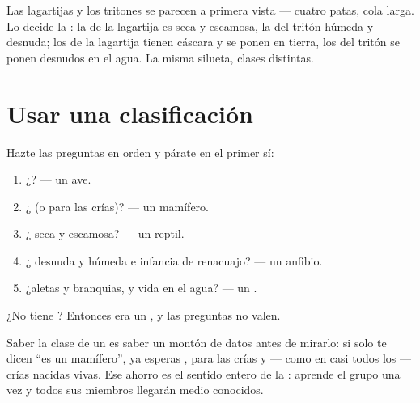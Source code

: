 \begin{remark}\label{rem:g4:classifying-animals:confusion}
Las lagartijas y los tritones se parecen a primera vista --- cuatro
patas, cola larga. Lo decide la : la de la lagartija es seca y
escamosa, la del tritón húmeda y desnuda; los  de la lagartija
tienen cáscara y se ponen en tierra, los del tritón se ponen desnudos
en el agua. La misma silueta, clases distintas.
\end{remark}

\section{Usar una clasificación}

\begin{method}\label{met:g4:classifying-animals:place}
Hazte las preguntas en orden y párate en el primer sí:
\begin{enumerate}
  \item ¿? --- un ave.
  \item ¿ (o  para las crías)? --- un mamífero.
  \item ¿ seca y escamosa? --- un reptil.
  \item ¿ desnuda y húmeda e infancia de renacuajo? --- un
        anfibio.
  \item ¿aletas y branquias, y vida en el agua? --- un .
\end{enumerate}
¿No tiene ? Entonces era un , y las
preguntas no valen.
\end{method}

\begin{proposition}\label{prop:g4:classifying-animals:free}
Saber la clase de un  es saber un montón de datos antes de
mirarlo: si solo te dicen ``es un mamífero'', ya esperas , 
para las crías y --- como en casi todos los  --- crías
nacidas vivas. Ese ahorro es el sentido entero de la :
aprende el grupo una vez y todos sus miembros llegarán medio conocidos.
\end{proposition}
\admitted

